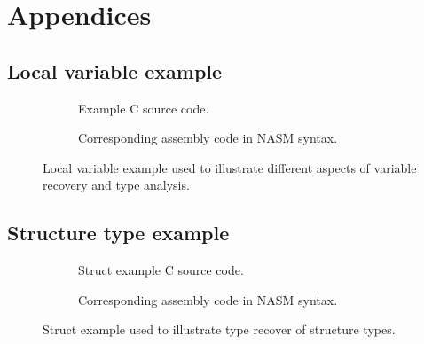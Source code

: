 
\onecolumn

\appendix
\setcounter{secnumdepth}{0}
\section{Appendices}
\setcounter{secnumdepth}{3}
\renewcommand{\thesubsection}{\Alph{subsection}}


\subsection{Local variable example}
\label{app:local_variable_example}

\begin{figure}[htbp]
	\centering
	\begin{subfigure}[ht]{0.3\textwidth}
		\centering
		
		\caption{Example C source code.}
		\label{fig:local_variable_example_c}
	\end{subfigure}
	\qquad
	\begin{subfigure}[ht]{0.65\textwidth}
		\centering
		
		\caption{Corresponding assembly code in NASM syntax.}
		\label{fig:local_variable_example_asm}
	\end{subfigure}
	\caption{Local variable example used to illustrate different aspects of variable recovery and type analysis.}
	\label{fig:local_variable_example}
\end{figure}

\clearpage

\subsection{Structure type example}
\label{app:struct_example}

\begin{figure}[htbp]
	\centering
	\begin{subfigure}[ht]{0.3\textwidth}
		\centering
		
		\caption{Struct example C source code.}
		\label{fig:struct_example_c}
	\end{subfigure}
	\qquad
	\begin{subfigure}[ht]{0.65\textwidth}
		\centering
		
		\caption{Corresponding assembly code in NASM syntax.}
		\label{fig:struct_example_asm}
	\end{subfigure}
	\caption{Struct example used to illustrate type recover of structure types.}
	\label{fig:struct_example}
\end{figure}
